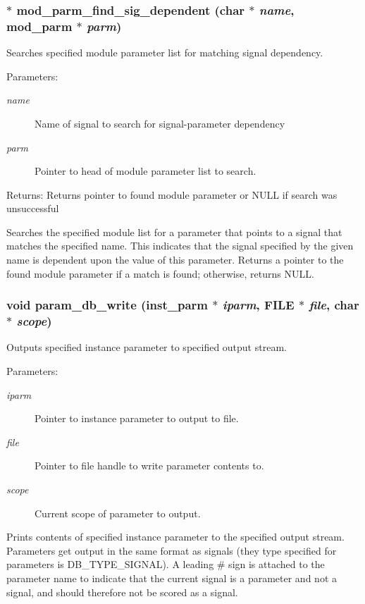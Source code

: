 \subsubsection{$\ast$ mod\_\-parm\_\-find\_\-sig\_\-dependent (char $\ast$ {\em name}, {\bf mod\_\-parm} $\ast$ {\em parm})}\label{param_8h_a1}


Searches specified module parameter list for matching signal dependency.

\begin{Desc}
\item[Parameters:]
\begin{description}
\item[{\em name}]Name of signal to search for signal-parameter dependency \item[{\em parm}]Pointer to head of module parameter list to search.\end{description}
\end{Desc}
\begin{Desc}
\item[Returns:]Returns pointer to found module parameter or NULL if search was unsuccessful\end{Desc}
Searches the specified module list for a parameter that points to a signal that matches the specified name. This indicates that the signal specified by the given name is dependent upon the value of this parameter. Returns a pointer to the found module parameter if a match is found; otherwise, returns NULL. 
\subsubsection{\setlength{\rightskip}{0pt plus 5cm}void param\_\-db\_\-write ({\bf inst\_\-parm} $\ast$ {\em iparm}, FILE $\ast$ {\em file}, char $\ast$ {\em scope})}\label{param_8h_a11}


Outputs specified instance parameter to specified output stream.

\begin{Desc}
\item[Parameters:]
\begin{description}
\item[{\em iparm}]Pointer to instance parameter to output to file. \item[{\em file}]Pointer to file handle to write parameter contents to. \item[{\em scope}]Current scope of parameter to output.\end{description}
\end{Desc}
Prints contents of specified instance parameter to the specified output stream. Parameters get output in the same format as signals (they type specified for parameters is DB\_\-TYPE\_\-SIGNAL). A leading \# sign is attached to the parameter name to indicate that the current signal is a parameter and not a signal, and should therefore not be scored as a signal. 
